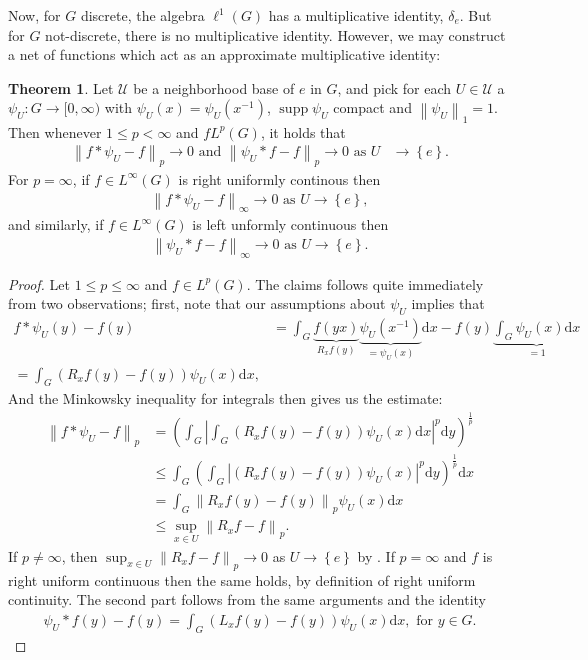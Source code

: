 \documentclass[10pt,twoside,openany,final]{memoir}
\theoremstyle{definition}
\newtheorem{theorem}{Theorem}[chapter]
\theoremstyle{Break}
\newcommand{\lv}{\left\lVert}
\newcommand{\rv}{\right\rVert}
\DeclareMathOperator{\supp}{supp}
\renewcommand{\d}{\mathrm{d}}
\begin{document}
Now, for $G$ discrete, the algebra $\ell^1(G)$ has a multiplicative identity, $\delta_e$. But for $G$ not-discrete, there is no multiplicative identity. However, we may construct a net of functions which act as an approximate multiplicative identity:
\begin{theorem}
	Let $\mathcal{U}$ be a neighborhood base of $e$ in $G$, and pick for each $U \in \mathcal{U}$ a $\psi_U \colon G \to [0,\infty)$ with $\psi_U(x)=\psi_U(x^{-1})$, $\supp \psi_U$ compact and $\lv \psi_U\rv_1=1$. Then whenever $1 \leq p < \infty$ and $f L^p(G)$, it holds that
		\begin{align*}
			\lv f \ast \psi_U - f \rv_p \to 0 \text{ and } \lv \psi_U \ast f - f \rv_p \to 0 \text{ as } U &\to \left\{ e \right\}.
		\end{align*}
	For $p=\infty$, if $f \in L^\infty(G)$ is right uniformly continous then
	\begin{align*}
		\lv f \ast \psi_U - f \rv_\infty \to 0 \text{ as } U \to \left\{ e \right\},
	\end{align*}
	and similarly, if $f \in L^\infty(G)$ is left unformly continuous then
	\begin{align*}
		\lv \psi_U \ast f - f \rv_\infty \to 0 \text{ as } U \to \left\{ e \right\}.
	\end{align*}
		\label{L1approxid}
\end{theorem}
\begin{proof}
	Let $1 \leq p \leq \infty$ and $f \in L^p(G)$. The claims follows quite immediately from two observations; first, note that our assumptions about $\psi_U$ implies that	
	\begin{align*}
		f \ast \psi_U(y) - f(y) &= \int_G \underbrace{f(yx)}_{R_x f(y)} \underbrace{\psi_U(x^{-1})}_{=\psi_U(x)} \d x - f(y) \underbrace{\int_G \psi_U(x) \d x}_{=1}\\
		=\int_G \left( R_x f(y)-f(y) \right)\psi_U(x) \d x,
	\end{align*}
	And the Minkowsky inequality for integrals then gives us the estimate:
	\begin{align*}
		\lv f \ast \psi_U - f \rv_p &= \left( \int_G \left|\int_G (R_x f(y) -f(y))\psi_U(x) \d x \right|^p \d y \right)^{\frac{1}{p}} \\
		&\leq \int_G \left( \int_G |(R_x f(y)-f(y))\psi_U(x)|^p \d y \right)^{\frac{1}{p}} \d x\\
		&= \int_G \lv R_x f(y) - f(y) \rv_p \psi_U(x) \d x \\
		&\leq \sup_{x \in U} \lv R_x f-f\rv_p.
	\end{align*}
	If $p \neq \infty$, then $\displaystyle\sup_{x \in U} \lv R_x f-f\rv_p \to 0$ as $U \to \left\{ e \right\}$ by . If $p = \infty$ and $f$ is right uniform continuous then the same holds, by definition of right uniform continuity. The second part follows from the same arguments and the identity
	\begin{align*}
		\psi_U \ast f(y) - f(y) = \int_{G}(L_x f(y)-f(y))\psi_U(x) \d x, \text{ for } y \in G.
	\end{align*}
\end{proof}
\end{document}
